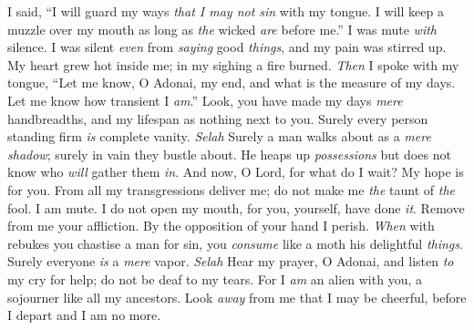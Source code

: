 \begin{biblechapter} %
 I said, “I will guard my ways 
\textit{that I may not sin} with my tongue. 
I will keep a muzzle over my mouth 
as long as \textit{the} wicked \textit{are} before me.”
\verse I was mute \textit{with} silence. I was silent \textit{even} from \textit{saying} good \textit{things}, 
and my pain was stirred up.
\verse My heart grew hot inside me; 
in my sighing a fire burned. 
\textit{Then} I spoke with my tongue,
\verse “Let me know, O Adonai, my end, 
and what is the measure of my days. 
Let me know how transient I \textit{am}.”
\verse Look, you have made my days \textit{mere} handbreadths, 
and my lifespan as nothing next to you. 
Surely every person standing firm \textit{is} complete vanity. \textit{Selah}
\verse Surely a man walks about as a \textit{mere} \textit{shadow}; 
surely in vain they bustle about. 
He heaps up \textit{possessions} but does not know who \textit{will} gather them \textit{in}.
\verse And now, O Lord, for what do I wait? 
My hope is for you.
\verse From all my transgressions deliver me; 
do not make me \textit{the} taunt of \textit{the} fool.
\verse I am mute. I do not open my mouth, 
for you, yourself, have done \textit{it}.
\verse Remove from me your affliction. 
By the opposition of your hand I perish.
\verse \textit{When} with rebukes you chastise a man for sin, 
you \textit{consume} like a moth his delightful \textit{things}. 
Surely everyone \textit{is} a \textit{mere} vapor. \textit{Selah}
\verse Hear my prayer, O Adonai, and listen \textit{to} my cry for help; 
do not be deaf to my tears. 
For I \textit{am} an alien with you, 
a sojourner like all my ancestors.
\verse Look \textit{away} from me that I may be cheerful, 
before I depart and I am no more.
\end{biblechapter}

